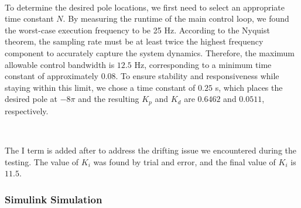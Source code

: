 \documentclass{article}
\begin{document}
\

To determine the desired pole locations, we first need to select an appropriate
time constant $N$. By measuring the runtime of the main control loop, we found
the worst-case execution frequency to be 25 Hz. According to the Nyquist
theorem, the sampling rate must be at least twice the highest frequency
component to accurately capture the system dynamics. Therefore, the maximum
allowable control bandwidth is $12.5$ Hz, corresponding to a minimum time constant
of approximately $0.08$. To ensure stability and responsiveness while staying
within this limit, we chose a time constant of $0.25$ s, which places the
desired pole at $-8\pi$ and the resulting $K_p$ and $K_d$ are $0.6462$ and $0.0511$,
respectively.

\

The I term is added after to address the drifting issue we encountered during
the testing. The value of $K_i$ was found by trial and error, and the final
value of $K_i$ is $11.5$.

\subsubsection{Simulink Simulation}
\end{document}
